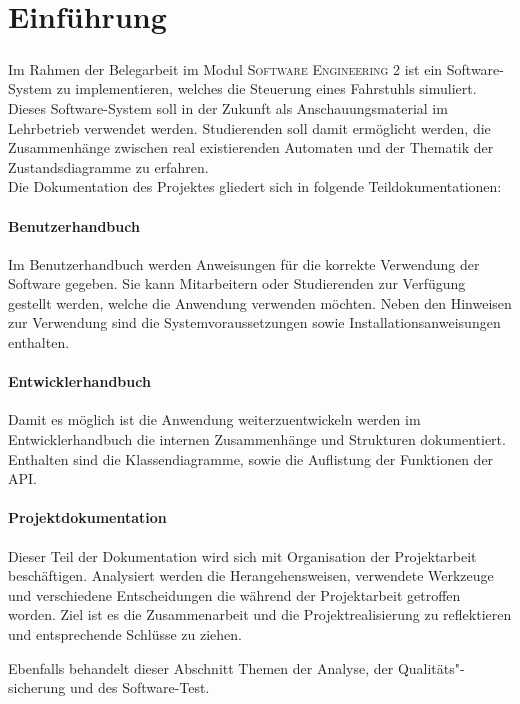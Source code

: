 \chapter{Einführung}
\paragraph{}
Im Rahmen der Belegarbeit im Modul \textsc{Software Engineering 2} ist ein Software-System zu implementieren, welches die Steuerung eines Fahrstuhls simuliert. Dieses Software-System soll in der Zukunft als Anschauungsmaterial im Lehrbetrieb verwendet werden. Studierenden soll damit ermöglicht werden, die Zusammenhänge zwischen real existierenden Automaten und der Thematik der Zustandsdiagramme zu erfahren.
\\
Die Dokumentation des Projektes gliedert sich in folgende Teildokumentationen:
\subsubsection*{Benutzerhandbuch}
Im Benutzerhandbuch werden Anweisungen für die korrekte Verwendung der Software gegeben. Sie kann Mitarbeitern oder Studierenden zur Verfügung gestellt werden, welche die Anwendung verwenden möchten. Neben den Hinweisen zur Verwendung sind die Systemvoraussetzungen sowie Installationsanweisungen enthalten.

\subsubsection*{Entwicklerhandbuch}
Damit es möglich ist die Anwendung weiterzuentwickeln werden im Entwicklerhandbuch die internen Zusammenhänge und Strukturen dokumentiert. Enthalten sind die Klassendiagramme, sowie die Auflistung der Funktionen der \gls{API}.\\

\subsubsection*{Projektdokumentation}
Dieser Teil der Dokumentation wird sich mit Organisation der Projektarbeit beschäftigen. Analysiert werden die Herangehensweisen, verwendete Werkzeuge und verschiedene Entscheidungen die während der Projektarbeit getroffen worden. Ziel ist es die Zusammenarbeit und die Projektrealisierung zu reflektieren und entsprechende Schlüsse zu ziehen.

Ebenfalls behandelt dieser Abschnitt Themen der Analyse, der Qualitäts"-sicherung und des Software-Test.

